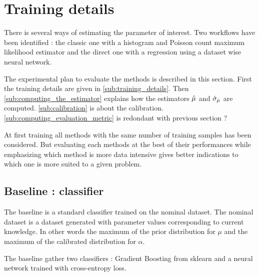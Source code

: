 \section{Training details} %
\label{sec:training_details}



There is several ways of estimating the parameter of interest.
Two workflows have been identified : the classic one with a histogram and Poisson count maximum likelihood estimator and the direct one with a regression using a dataset wise neural network.

The experimental plan to evaluate the methods is described in this section.
First the training details are given in \autoref{sub:training_details}.
Then \autoref{sub:computing_the_estimator} explains how the estimators $\hat\mu$ and $\hat\sigma_{\hat\mu}$ are computed.
\autoref{sub:calibration} is about the calibration.
\autoref{sub:computing_evaluation_metric} is redondant with previous section ?



At first training all methods with the same number of training samples has been considered.
But evaluating each methods at the best of their performances while emphasizing which method is more data intensive gives better indications to which one is more suited to a given problem.








\subsection{Baseline : classifier} %
\label{sub:baseline_classifier}

The baseline is a standard classifier trained on the nominal dataset.
The nominal dataset is a dataset generated with parameter values corresponding to current knowledge.
In other words the maximum of the prior distribution for $\mu$ and the maximum of the calibrated distribution for $\alpha$.

The baseline gather two classifiers : Gradient Boosting from sklearn \needcite and a neural network trained with cross-entropy loss.

